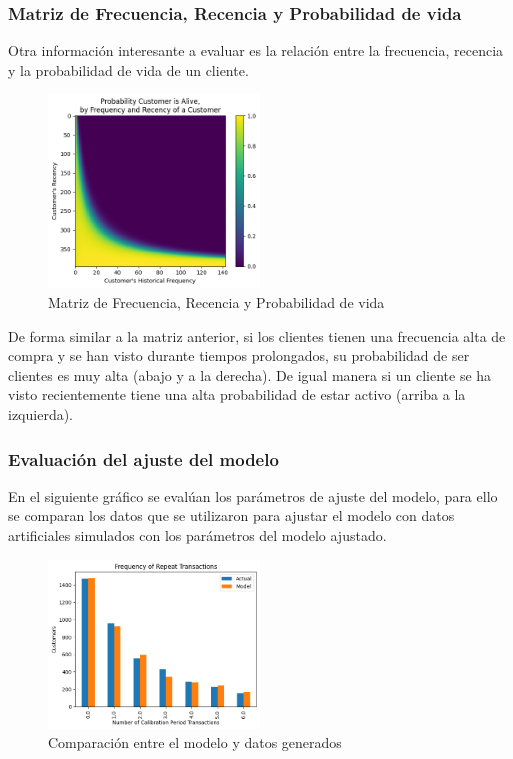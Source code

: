 \subsubsection{Matriz de Frecuencia, Recencia y Probabilidad de vida}

Otra información interesante a evaluar es la relación entre la frecuencia, recencia y la probabilidad de vida de un cliente.

\begin{figure}[H]
	\centering \includegraphics[width=0.50\textwidth]{images/probabilidad-vida.png}
	\caption{Matriz de Frecuencia, Recencia y Probabilidad de vida}
	\label{fig:frp}
\end{figure}

De forma similar a la matriz anterior, si los clientes tienen una frecuencia alta de compra y se han visto durante tiempos prolongados, su probabilidad de ser clientes es muy alta (abajo y a la derecha). De igual manera si un cliente se ha visto recientemente tiene una alta probabilidad de estar activo (arriba a la izquierda).

\subsubsection{Evaluación del ajuste del modelo}

En el siguiente gráfico se evalúan los parámetros de ajuste del modelo, para ello se comparan los datos que se utilizaron para ajustar el modelo con datos artificiales simulados con los parámetros del modelo ajustado.

\begin{figure}[H]
	\centering \includegraphics[width=0.50\textwidth]{images/ajuste-modelo.png}
	\caption{Comparación entre el modelo y datos generados}
	\label{fig:ajuste}
\end{figure}

